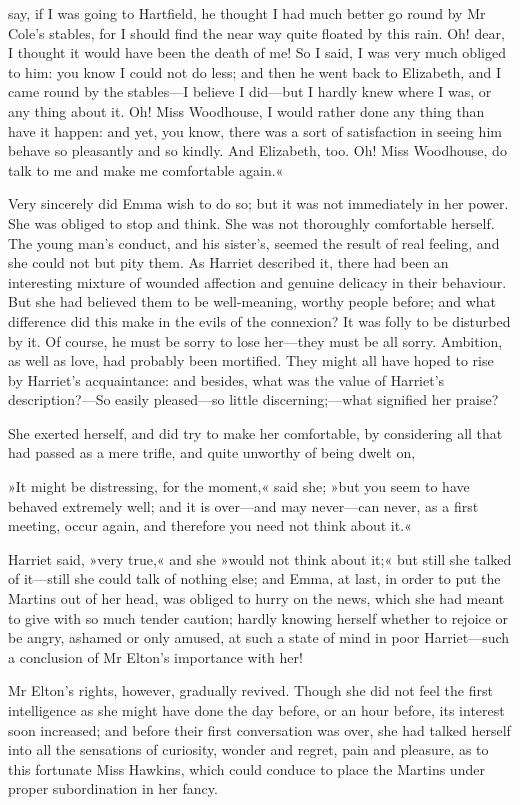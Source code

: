 say, if I was going to Hartfield, he thought I had much better go round by Mr Cole's stables, for I should find the near way quite floated by this rain. Oh! dear, I thought it would have been the death of me! So I said, I was very much obliged to him: you know I could not do less; and then he went back to Elizabeth, and I came round by the stables—I believe I did—but I hardly knew where I was, or any thing about it. Oh! Miss Woodhouse, I would rather done any thing than have it happen: and yet, you know, there was a sort of satisfaction in seeing him behave so pleasantly and so kindly. And Elizabeth, too. Oh! Miss Woodhouse, do talk to me and make me comfortable again.«

Very sincerely did Emma wish to do so; but it was not immediately in her power. She was obliged to stop and think. She was not thoroughly comfortable herself. The young man's conduct, and his sister's, seemed the result of real feeling, and she could not but pity them. As Harriet described it, there had been an interesting mixture of wounded affection and genuine delicacy in their behaviour. But she had believed them to be well-meaning, worthy people before; and what difference did this make in the evils of the connexion? It was folly to be disturbed by it. Of course, he must be sorry to lose her—they must be all sorry. Ambition, as well as love, had probably been mortified. They might all have hoped to rise by Harriet's acquaintance: and besides, what was the value of Harriet's description?—So easily pleased—so little discerning;—what signified her praise?

She exerted herself, and did try to make her comfortable, by considering all that had passed as a mere trifle, and quite unworthy of being dwelt on,

»It might be distressing, for the moment,« said she; »but you seem to have behaved extremely well; and it is over—and may never—can never, as a first meeting, occur again, and therefore you need not think about it.«

Harriet said, »very true,« and she »would not think about it;« but still she talked of it—still she could talk of nothing else; and Emma, at last, in order to put the Martins out of her head, was obliged to hurry on the news, which she had meant to give with so much tender caution; hardly knowing herself whether to rejoice or be angry, ashamed or only amused, at such a state of mind in poor Harriet—such a conclusion of Mr Elton's importance with her!

Mr Elton's rights, however, gradually revived. Though she did not feel the first intelligence as she might have done the day before, or an hour before, its interest soon increased; and before their first conversation was over, she had talked herself into all the sensations of curiosity, wonder and regret, pain and pleasure, as to this fortunate Miss Hawkins, which could conduce to place the Martins under proper subordination in her fancy.

